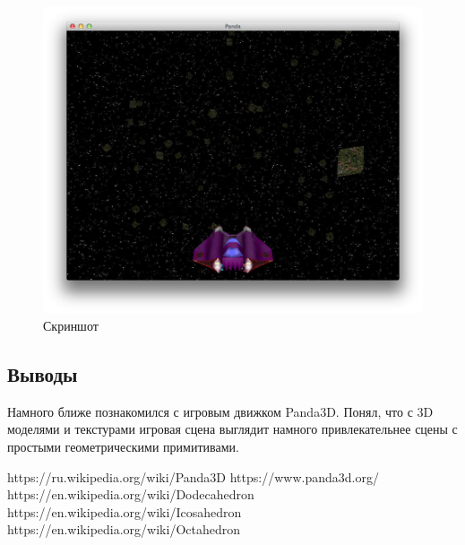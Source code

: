 \documentclass[12pt]{article}
\begin{document}
\begin{figure}[!htb]
  \centering
    \includegraphics[scale=0.5]{pics/game.png}
   \caption{Скриншот}
    \label{fig:game}
\end{figure}

\subsection*{Выводы}
Намного ближе познакомился с игровым движком Panda3D.
Понял, что с 3D моделями и текстурами игровая сцена выглядит
намного привлекательнее сцены с простыми геометрическими примитивами.

\begin{thebibliography}{}
 https://ru.wikipedia.org/wiki/Panda3D
 https://www.panda3d.org/
 https://en.wikipedia.org/wiki/Dodecahedron
 https://en.wikipedia.org/wiki/Icosahedron
 https://en.wikipedia.org/wiki/Octahedron
\end{thebibliography}
\end{document}
